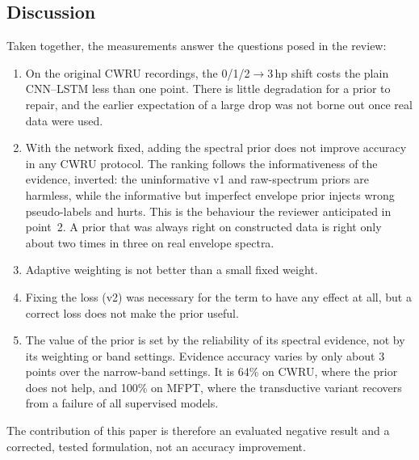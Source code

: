 \documentclass[conference]{IEEEtran}
\begin{document}
\subsection{Discussion}
Taken together, the measurements answer the questions posed in the review:
\begin{enumerate}
\item On the original CWRU recordings, the 0/1/2$\to$3\,hp shift costs the
plain CNN--LSTM less than one point. There is little degradation for a prior
to repair, and the earlier expectation of a large drop was not borne out once
real data were used.
\item With the network fixed, adding the spectral prior does not improve accuracy
in any CWRU protocol. The ranking follows the informativeness of the evidence,
inverted: the uninformative v1 and raw-spectrum priors are harmless, while the
informative but imperfect envelope prior injects wrong pseudo-labels and hurts.
This is the behaviour the reviewer anticipated in point~2. A prior that was
always right on constructed data is right only about two times in three on real
envelope spectra.
\item Adaptive weighting is not better than a small fixed weight.
\item Fixing the loss (v2) was necessary for the term to have any effect at all,
but a correct loss does not make the prior useful.
\item The value of the prior is set by the reliability of its spectral
evidence, not by its weighting or band settings. Evidence accuracy varies by
only about 3 points over the narrow-band settings. It is 64\% on CWRU, where the
prior does not help, and 100\% on MFPT, where the transductive variant recovers
from a failure of all supervised models.
\end{enumerate}
The contribution of this paper is therefore an evaluated negative result and a
corrected, tested formulation, not an accuracy improvement.
\end{document}
